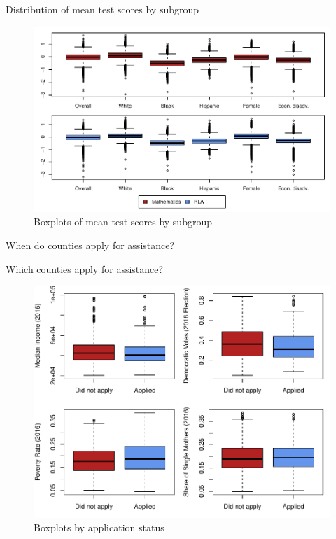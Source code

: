 \documentclass[hyperref={colorlinks = true,linkcolor = blue, citecolor=blue,urlcolor=blue}]{beamer}
\begin{document}
\begin{frame}{Distribution of mean test scores by subgroup}
	\begin{figure}[!h]
		\centering
		\includegraphics[scale=0.68]{"../Code & Data/DepVarsBoxplot.pdf"}
		\caption{Boxplots of mean test scores by subgroup}
		\label{DepVarsBoxplot}
	\end{figure}
\end{frame}


\begin{frame}{When do counties apply for assistance?}
	\small
	
\end{frame}

\begin{frame}{Which counties apply for assistance?}
	\begin{figure}[!h]
		\centering
		\includegraphics[scale=0.58]{"../Code & Data/AssistanceCovBoxplot.pdf"}
		\caption{Boxplots by application status}
		\label{AssistCovBoxplot}
	\end{figure}
\end{frame}
\end{document}
